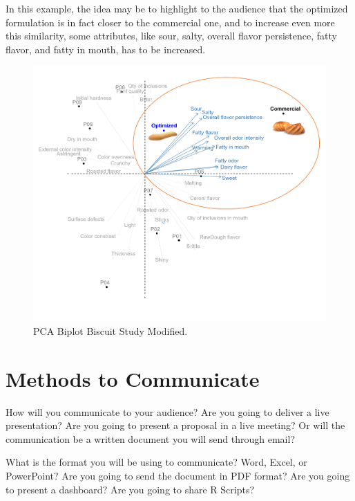\documentclass[
]{krantz}
\begin{document}
In this example, the idea may be to highlight to the audience that the optimized formulation is in fact closer to the commercial one, and to increase even more this similarity, some attributes, like sour, salty, overall flavor persistence, fatty flavor, and fatty in mouth, has to be increased.

\begin{figure}

{\centering \includegraphics[width=1\linewidth]{images/PCA_management} 

}

\caption{PCA Biplot Biscuit Study Modified.}\label{fig:pcamanagement}
\end{figure}

\hypertarget{methods-to-communicate}{%
\section{Methods to Communicate}\label{methods-to-communicate}}

How will you communicate to your audience? Are you going to deliver a live presentation? Are you going to present a proposal in a live meeting? Or will the communication be a written document you will send through email?

What is the format you will be using to communicate? Word, Excel, or PowerPoint? Are you going to send the document in PDF format? Are you going to present a dashboard? Are you going to share R Scripts?
\end{document}
